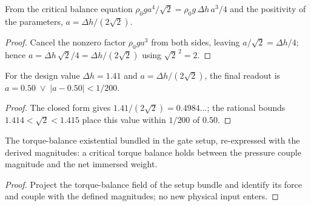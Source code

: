 \begin{lemma}
\label{lem:IPhO2026Problems_problem_IPhO_2026_1_A_1:side_length_eq_delta_h_over}
From the critical balance equation
$\rho_0 g a^4/\sqrt{2} = \rho_0 g\, \Delta h\, a^3/4$ and the positivity of
the parameters, $a = \Delta h/(2\sqrt{2})$.
\end{lemma}
\begin{proof}
Cancel the nonzero factor $\rho_0 g a^3$ from both sides, leaving
$a/\sqrt{2} = \Delta h/4$; hence $a = \Delta h\, \sqrt{2}/4 =
\Delta h/(2\sqrt{2})$ using $\sqrt{2}^{\,2} = 2$.
\end{proof}

\begin{lemma}[Numerical readout at $\Delta h = 1.41$]
\label{lem:IPhO2026Problems_problem_IPhO_2026_1_A_1:numerical_value}
For the design value $\Delta h = 1.41$ and $a = \Delta h/(2\sqrt{2})$, the
final readout is $a = 0.50 \;\lor\; |a - 0.50| < 1/200$.
\end{lemma}
\begin{proof}
The closed form gives $1.41/(2\sqrt{2}) = 0.4984\ldots$; the rational bounds
$1.414 < \sqrt{2} < 1.415$ place this value within $1/200$ of $0.50$.
\end{proof}

\begin{lemma}
\label{lem:IPhO2026Problems_problem_IPhO_2026_1_A_1:torque_balance_contract}
The torque-balance existential bundled in the gate setup, re-expressed with
the derived magnitudes: a critical torque balance holds between the pressure
couple magnitude and the net immersed weight.
\end{lemma}
\begin{proof}
Project the torque-balance field of the setup bundle and identify its force
and couple with the defined magnitudes; no new physical input enters.
\end{proof}

